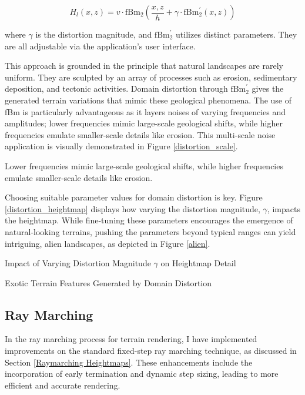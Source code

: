 \begin{equation}
    H_l(x,z) = v\cdot\text{fBm}_{2}\left(\frac{x,z}{h}+\gamma\cdot\text{fBm}^\prime_2(x,z)\right)
\end{equation}

where $\gamma$ is the distortion magnitude, and $\text{fBm}^\prime_2$ utilizes distinct parameters. They are all adjustable via the application’s user interface.

This approach is grounded in the principle that natural landscapes are rarely uniform. They are sculpted by an array of processes such as erosion, sedimentary deposition, and tectonic activities. Domain distortion through $\text{fBm}^\prime_2$ gives the generated terrain variations that mimic these geological phenomena. The use of fBm is particularly advantageous as it layers noises of varying frequencies and amplitudes; lower frequencies mimic large-scale geological shifts, while higher frequencies emulate smaller-scale details like erosion. This multi-scale noise application is visually demonstrated in Figure \ref{distortion_scale}.

{Lower frequencies mimic large-scale geological shifts, while higher frequencies emulate smaller-scale details like erosion.}

Choosing suitable parameter values for domain distortion is key.  Figure \ref{distortion_heightmap} displays how varying the distortion magnitude, $\gamma$, impacts the heightmap. While fine-tuning these parameters encourages the emergence of natural-looking terrains, pushing the parameters beyond typical ranges can yield intriguing, alien landscapes, as depicted in Figure \ref{alien}.

{Impact of Varying Distortion Magnitude $\gamma$ on Heightmap Detail}

{Exotic Terrain Features Generated by Domain Distortion}

\subsection{Ray Marching}
\label{Terrain Raymarching}

In the ray marching process for terrain rendering, I have implemented improvements on the standard fixed-step ray marching technique, as discussed in Section \ref{Raymarching Heightmaps}. These enhancements include the incorporation of early termination and dynamic step sizing, leading to more efficient and accurate rendering.

